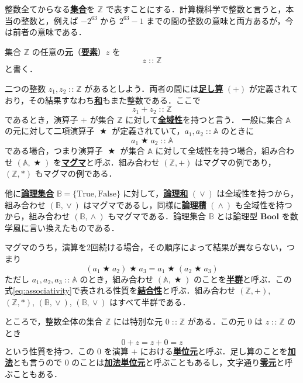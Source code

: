 \documentclass[a5paper,twoside,fleqn,draft]{jsbook}
\newcommand{\keyword}[1]{{\underline{\textbf{#1}}}}
\newcommand{\mSpecialConstant}[1]{\textrm{#1}}
\newcommand{\mFalse}{\mSpecialConstant{False}}
\newcommand{\mTrue}{\mSpecialConstant{True}}
\DeclareMathOperator{\mBinOp}{\bigstar}
\DeclareMathOperator{\mIn}{{:\!:}}
\DeclareMathOperator{\mLogicalAnd}{\wedge}
\DeclareMathOperator{\mLogicalOr}{\vee}
\newcommand{\mSpecialSet}[1]{\mathbb{#1}}
\newcommand{\mASet}{\mSpecialSet{A}}
\newcommand{\mBSet}{\mSpecialSet{B}}
\newcommand{\mZSet}{\mSpecialSet{Z}}
\newcommand{\mType}[1]{\mathbf{#1}} %
\newcommand{\mBoolType}{\mType{Bool}}
\newcommand{\mTupleWith}[1]{\left(#1\right)}
\begin{document}
整数全てからなる\keyword{集合}を $\mZSet$ で表すことにする．計算機科学で整数と言うと，本当の整数と，例えば $-2^{63}$ から $2^{63}-1$ までの間の整数の意味と両方あるが，今は前者の意味である．

集合 $\mZSet$ の任意の\keyword{元}（\keyword{要素}）$z$ を
\begin{equation}
  z
  \mIn\mZSet
\end{equation}
と書く．

二つの整数 $z_1,z_2\mIn\mZSet$ があるとしよう．両者の間には\keyword{足し算} $(+)$ が定義されており，その結果すなわち\keyword{和}もまた整数である．ここで
\begin{equation}
  z_1+z_2
  \mIn\mZSet
\end{equation}
であるとき，演算子 $+$ が集合 $\mZSet$ に対して\keyword{全域性}を持つと言う．
一般に集合 $\mASet$ の元に対して二項演算子 $\mBinOp$ が定義されていて，$a_1,a_2\mIn\mASet$ のときに
\begin{equation}
  \label{eq:totality}
  a_1\mBinOp a_2
  \mIn\mASet
\end{equation}
である場合，つまり演算子 $\mBinOp$ が集合 $\mASet$ に対して全域性を持つ場合，組み合わせ $\mTupleWith{\mASet,\mBinOp}$ を\keyword{マグマ}と呼ぶ．組み合わせ $\mTupleWith{\mZSet,+}$ はマグマの例であり，$\mTupleWith{\mZSet,*}$ もマグマの例である．

他に\keyword{論理集合} $\mBSet=\{\mTrue,\mFalse\}$ に対して，\keyword{論理和} $(\mLogicalOr)$ は全域性を持つから，組み合わせ $\mTupleWith{\mBSet,\mLogicalOr}$ はマグマであるし，同様に\keyword{論理積} $(\mLogicalAnd)$ も全域性を持つから，組み合わせ $\mTupleWith{\mBSet,\mLogicalAnd}$ もマグマである．論理集合 $\mBSet$ とは論理型 $\mBoolType$ を数学風に言い換えたものである．

マグマのうち，演算を2回続ける場合，その順序によって結果が異ならない，つまり
\begin{equation}
  \label{eq:associativity}
  \left(a_1\mBinOp a_2\right)\mBinOp a_3
  =a_1\mBinOp\left(a_2\mBinOp{a_3}\right)
\end{equation}
ただし $a_1,a_2,a_3\mIn\mASet$ のとき，組み合わせ $\mTupleWith{\mASet,\mBinOp}$ のことを\keyword{半群}と呼ぶ．この式\eqref{eq:associativity}で表される性質を\keyword{結合性}と呼ぶ．組み合わせ $\mTupleWith{\mZSet,+}$, $\mTupleWith{\mZSet,*}$, $\mTupleWith{\mBSet,\mLogicalOr}$, $\mTupleWith{\mBSet,\mLogicalOr}$ はすべて半群である．

ところで，整数全体の集合 $\mZSet$ には特別な元 $0\mIn\mZSet$ がある．この元 $0$ は $z\mIn\mZSet$ のとき
\begin{equation}
  0+z
  =z+0
  =z
\end{equation}
という性質を持つ．この $0$ を演算 $+$ における\keyword{単位元}と呼ぶ．足し算のことを\keyword{加法}とも言うので $0$ のことは\keyword{加法単位元}と呼ぶこともあるし，文字通り\keyword{零元}と呼ぶこともある．
\end{document}
